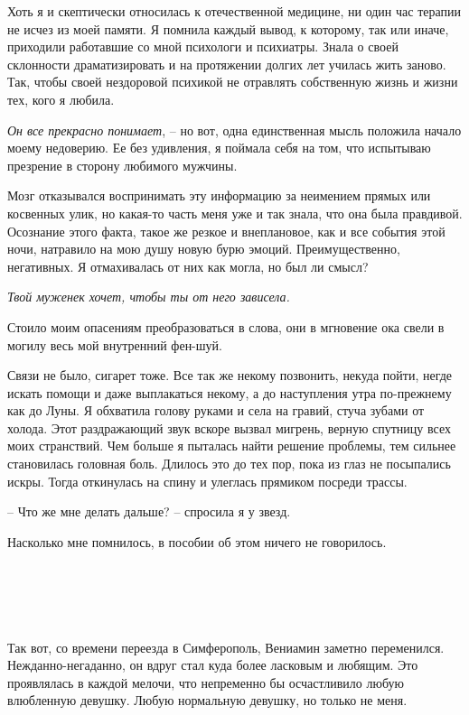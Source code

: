 \documentclass[
]{book}
\begin{document}
Хоть я и скептически относилась к отечественной медицине, ни один час терапии не исчез из моей памяти. Я помнила каждый вывод, к которому, так или иначе, приходили работавшие со мной психологи и психиатры. Знала о своей склонности драматизировать и на протяжении долгих лет училась жить заново. Так, чтобы своей нездоровой психикой не отравлять собственную жизнь и жизни тех, кого я любила.

\emph{Он все прекрасно понимает}, -- но вот, одна единственная мысль положила начало моему недоверию. Ее без удивления, я поймала себя на том, что испытываю презрение в сторону любимого мужчины.

Мозг отказывался воспринимать эту информацию за неимением прямых или косвенных улик, но какая-то часть меня уже и так знала, что она была правдивой. Осознание этого факта, такое же резкое и внеплановое, как и все события этой ночи, натравило на мою душу новую бурю эмоций. Преимущественно, негативных. Я отмахивалась от них как могла, но был ли смысл?

\emph{Твой муженек хочет, чтобы ты от него зависела.}

Стоило моим опасениям преобразоваться в слова, они в мгновение ока свели в могилу весь мой внутренний фен-шуй.

Связи не было, сигарет тоже. Все так же некому позвонить, некуда пойти, негде искать помощи и даже выплакаться некому, а до наступления утра по-прежнему как до Луны. Я обхватила голову руками и села на гравий, стуча зубами от холода. Этот раздражающий звук вскоре вызвал мигрень, верную спутницу всех моих странствий. Чем больше я пыталась найти решение проблемы, тем сильнее становилась головная боль. Длилось это до тех пор, пока из глаз не посыпались искры. Тогда откинулась на спину и улеглась прямиком посреди трассы.

-- Что же мне делать дальше? -- спросила я у звезд.

Насколько мне помнилось, в пособии об этом ничего не говорилось.

\hypertarget{chapter-71}{%
\chapter{~}\label{chapter-71}}

Так вот, со времени переезда в Симферополь, Вениамин заметно переменился. Нежданно-негаданно, он вдруг стал куда более ласковым и любящим. Это проявлялась в каждой мелочи, что непременно бы осчастливило любую влюбленную девушку. Любую нормальную девушку, но только не меня.
\end{document}
